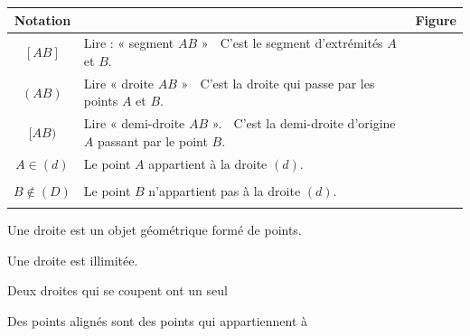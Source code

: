 \documentclass[a4paper,10pt]{report}
\begin{document}
\begin{center}
\renewcommand{\arraystretch}{1.28}
\begin{tabular}{|c|p{6.1cm}|c|}
\hline
Notation & \centering{Signification} & \hspace{2.1cm}Figure\hspace{2.1cm} \\\hline
$[AB]$ & Lire : « segment $AB$ » \hspace{3cm}\textcolor{white}{.} C'est le segment d'extrémités $A$ et $B$. &\\\hline
$(AB)$ & Lire « droite $AB$ » \hspace{3.5cm}\textcolor{white}{.} C'est la droite qui passe par les points $A$ et $B$. &\\\hline
$[AB)$ & Lire « demi-droite $AB$ ». \hspace{3.cm}\textcolor{white}{.} C'est la demi-droite d'origine $A$ passant par le point $B$. &\\\hline
$A \in(d)$ & Le point $A$ appartient à la droite $(d)$. & \\
& &\\[-4pt]\hline
$B \notin(D)$ & Le point $B$ n'appartient pas à la droite $(d)$. & \\
& &\\[-4pt]\hline
\end{tabular}
\end{center}

\begin{defn}
Une droite est un objet géométrique formé de points.

\noindent Une droite est illimitée.
\end{defn}

\begin{rems}
\item[•] Deux droites qui se coupent ont un seul \dotfill \medskip
\item[•] Des points alignés sont des points qui appartiennent à \dotfill
\end{rems}
\end{document}

